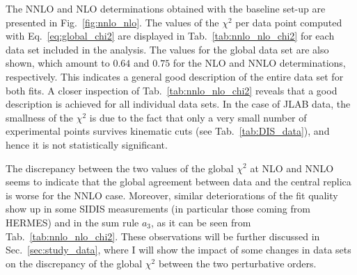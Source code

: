 The NNLO and NLO determinations obtained with the baseline set-up are presented in Fig.~\ref{fig:nnlo_nlo}. The values of the $\chi^2$ per data point computed with Eq.~\eqref{eq:global_chi2} are displayed in Tab.~\ref{tab:nnlo_nlo_chi2} for each data set included in the analysis. The values for the global data set are also shown, which amount to $0.64$ and $0.75$ for the NLO and NNLO determinations, respectively. This indicates a general good description of the entire data set for both fits. A closer inspection of Tab.~\ref{tab:nnlo_nlo_chi2} reveals that a good description is achieved for all individual data sets. In the case of JLAB data, the smallness of the $\chi^2$ is due to the fact that only a very small number of experimental points survives kinematic cuts (see Tab.~\ref{tab:DIS_data}), and hence it is not statistically significant.%

The discrepancy between the two values of the global $\chi^2$ at NLO and NNLO seems to indicate that the global agreement between data and the central replica is worse for the NNLO case. Moreover, similar deteriorations of the fit quality show up in some SIDIS measurements (in particular those coming from HERMES) and in the sum rule $a_3$, as it can be seen from Tab.~\ref{tab:nnlo_nlo_chi2}. These observations will be further discussed in Sec.~\ref{sec:study_data}, where I will show the impact of some changes in data sets on the discrepancy of the global $\chi^2$ between the two perturbative orders.

  
